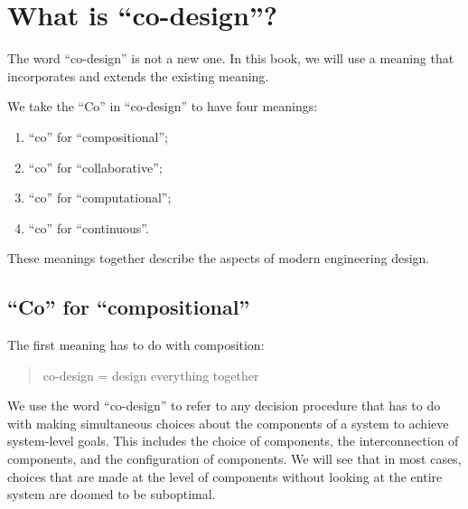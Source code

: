 
\section{What is ``co-design''?}
\label{sec:design-what-is-co-design}

The word ``co-design'' is not a new one.
In this book, we will use a meaning that incorporates and extends the existing meaning.

We take the ``Co'' in ``co-design'' to have four meanings:
\begin{enumerate}
	\item ``co'' for ``compositional'';
	\item ``co'' for ``collaborative'';
	\item ``co'' for ``computational'';
	\item ``co'' for ``continuous''.
\end{enumerate}
These meanings together describe the aspects of modern engineering design.

\subsection{``Co'' for ``compositional''}

The first meaning has to do with composition:

\begin{quote}
	co-design = design everything together
\end{quote}

We use the word ``co-design'' to refer to any decision procedure that has to do with making simultaneous choices about the components of a system to achieve system-level goals.
This includes the choice of components, the interconnection of components, and the configuration of components.
We will see that in most cases, choices that are made at the level of components without looking at the entire system are doomed to be suboptimal.

